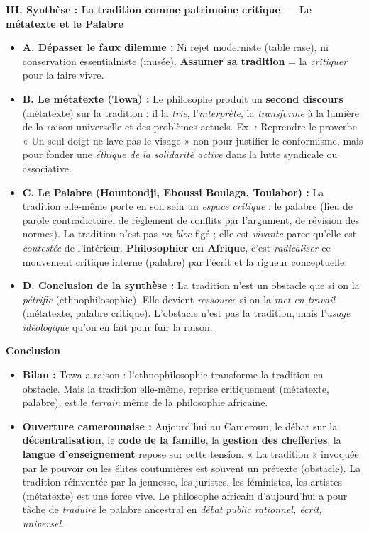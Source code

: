 \documentclass[11pt]{article}
\newcommand{\cle}[1]{{\popxbold\color{popdark}#1}}
\begin{document}
\begin{corrige}
\textbf{III. Synthèse : La tradition comme patrimoine critique — Le métatexte et le Palabre}
\begin{itemize}
\item \textbf{A. Dépasser le faux dilemme :} Ni rejet moderniste (table rase), ni conservation essentialniste (musée). \textbf{Assumer sa tradition} = la \emph{critiquer} pour la faire vivre.
\item \textbf{B. Le \cle{métatexte} (Towa) :} Le philosophe produit un \textbf{second discours} (métatexte) sur la tradition : il la \emph{trie}, l'\emph{interprète}, la \emph{transforme} à la lumière de la raison universelle et des problèmes actuels. Ex. : Reprendre le proverbe « Un seul doigt ne lave pas le visage » non pour justifier le conformisme, mais pour fonder une \emph{éthique de la solidarité active} dans la lutte syndicale ou associative.
\item \textbf{C. Le \cle{Palabre} (Hountondji, Eboussi Boulaga, Toulabor) :} La tradition elle-même porte en son sein un \emph{espace critique} : le palabre (lieu de parole contradictoire, de règlement de conflits par l'argument, de révision des normes). La tradition n'est pas \emph{un bloc} figé ; elle est \emph{vivante} parce qu'elle est \emph{contestée} de l'intérieur. \textbf{Philosophier en Afrique}, c'est \emph{radicaliser} ce mouvement critique interne (palabre) par l'écrit et la rigueur conceptuelle.
\item \textbf{D. Conclusion de la synthèse :} La tradition n'est un obstacle que si on la \emph{pétrifie} (ethnophilosophie). Elle devient \emph{ressource} si on la \emph{met en travail} (métatexte, palabre critique). L'obstacle n'est pas la tradition, mais l'\emph{usage idéologique} qu'on en fait pour fuir la raison.
\end{itemize}

\textbf{Conclusion}
\begin{itemize}
\item \textbf{Bilan :} Towa a raison : l'ethnophilosophie transforme la tradition en obstacle. Mais la tradition elle-même, reprise critique\-ment (métatexte, palabre), est le \emph{terrain} même de la philosophie africaine.
\item \textbf{Ouverture camerounaise :} Aujourd'hui au Cameroun, le débat sur la \textbf{décentralisation}, le \textbf{code de la famille}, la \textbf{gestion des chefferies}, la \textbf{langue d'enseignement} repose sur cette tension. « La tradition » invoquée par le pouvoir ou les élites coutumières est souvent un prétexte (obstacle). La tradition réinventée par la jeunesse, les juristes, les féministes, les artistes (métatexte) est une force vive. Le philosophe africain d'aujourd'hui a pour tâche de \emph{traduire} le palabre ancestral en \emph{débat public rationnel, écrit, universel}.
\end{itemize}
\end{corrige}
\end{document}
